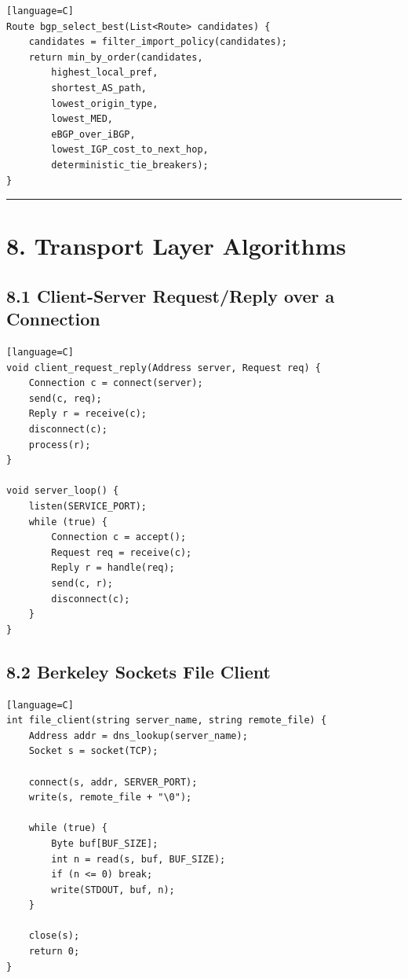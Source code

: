 \documentclass[11pt]{article}
\begin{document}
\begin{verbatim}[language=C]
Route bgp_select_best(List<Route> candidates) {
    candidates = filter_import_policy(candidates);
    return min_by_order(candidates,
        highest_local_pref,
        shortest_AS_path,
        lowest_origin_type,
        lowest_MED,
        eBGP_over_iBGP,
        lowest_IGP_cost_to_next_hop,
        deterministic_tie_breakers);
}
\end{verbatim}

\begin{center}\rule{0.5\linewidth}{0.5pt}\end{center}

\section{8. Transport Layer
Algorithms}\label{transport-layer-algorithms}

\subsection{8.1 Client-Server Request/Reply over a
Connection}\label{client-server-requestreply-over-a-connection}

\begin{verbatim}[language=C]
void client_request_reply(Address server, Request req) {
    Connection c = connect(server);
    send(c, req);
    Reply r = receive(c);
    disconnect(c);
    process(r);
}

void server_loop() {
    listen(SERVICE_PORT);
    while (true) {
        Connection c = accept();
        Request req = receive(c);
        Reply r = handle(req);
        send(c, r);
        disconnect(c);
    }
}
\end{verbatim}

\subsection{8.2 Berkeley Sockets File
Client}\label{berkeley-sockets-file-client}

\begin{verbatim}[language=C]
int file_client(string server_name, string remote_file) {
    Address addr = dns_lookup(server_name);
    Socket s = socket(TCP);

    connect(s, addr, SERVER_PORT);
    write(s, remote_file + "\0");

    while (true) {
        Byte buf[BUF_SIZE];
        int n = read(s, buf, BUF_SIZE);
        if (n <= 0) break;
        write(STDOUT, buf, n);
    }

    close(s);
    return 0;
}
\end{verbatim}
\end{document}
